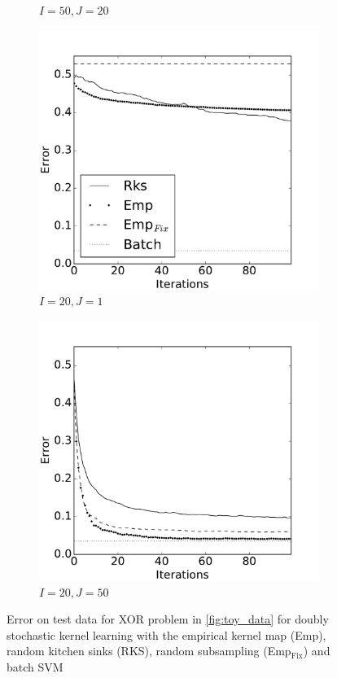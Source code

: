 \documentclass{article} %
\begin{document}
\begin{figure}[!ht]
\begin{subfigure}[b]{0.235\textwidth}
        \caption{$I=50, J=20$}
        \label{fig:expand_20_pred_50}
    \end{subfigure}
        \begin{subfigure}[b]{0.235\textwidth}
        \includegraphics[width=\textwidth]{imgs/rks_emp_comparison-pred-20-expand-1}
        \caption{$I=20, J=1$}
        \label{fig:pred_20_expand_1}
    \end{subfigure}
    \hfill
    \begin{subfigure}[b]{0.235\textwidth}
        \includegraphics[width=\textwidth]{imgs/rks_emp_comparison-pred-20-expand-50}
        \caption{$I=20, J=50$}
        \label{fig:pred_20_expand_50}
    \end{subfigure}
    \caption{Error on test data for XOR problem in \autoref{fig:toy_data} for doubly stochastic kernel learning with the empirical kernel map (Emp), random kitchen sinks (RKS), random subsampling (Emp$_{\text{Fix}}$) and batch SVM}
    \label{fig:toydata_comparisons}
\end{figure}
\end{document}
